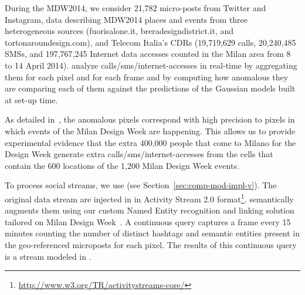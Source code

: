 During the MDW2014, we consider 21,782 micro-posts from Twitter and Instagram, data describing MDW2014 places and events from three heterogeneous sources (fuorisalone.it, breradesigndistrict.it, and tortonaroundesign.com), and Telecom Italia's CDRs (19,719,629 calls, 20,240,485 SMSs, and 197,767,245 Internet data accesses counted in the Milan area from 8 to 14 April 2014).
\hivedi{} analyze calls/sms/internet-accesses in real-time by aggregating them for each pixel and for each frame and by computing how anomalous they are comparing each of them against the predictions of the Gaussian models built at set-up time. 

As detailed in~\cite{DBLP:journals/ieeemm/BalduiniVALAC15}, the anomalous pixels correspond with high precision to pixels in which events of the Milan Design Week are happening. This allows us to provide experimental evidence that the extra 400,000 people that come to Milano for the Design Week generate extra calls/sms/internet-accesses from the cells that contain the 600 locations of the 1,200 Milan Design Week events.

To process social streams, we use \sti{} (see Section~\ref{sec:comp-mod-impl-v}). The original data stream are injected in \sti{} in Activity Stream 2.0 format\footnote{\url{http://www.w3.org/TR/activitystreams-core/}}. \sti{} semantically augments them using our custom Named Entity recognition and linking solution tailored on Milan Design Week~\cite{DBLP:conf/semweb/BalduiniV13}. A continuous query captures a frame every 15 minutes counting the number of distinct hashtags and semantic entities present in the geo-referenced microposts for each pixel. The results of this continuous query is a stream modeled in \frappe{}.


